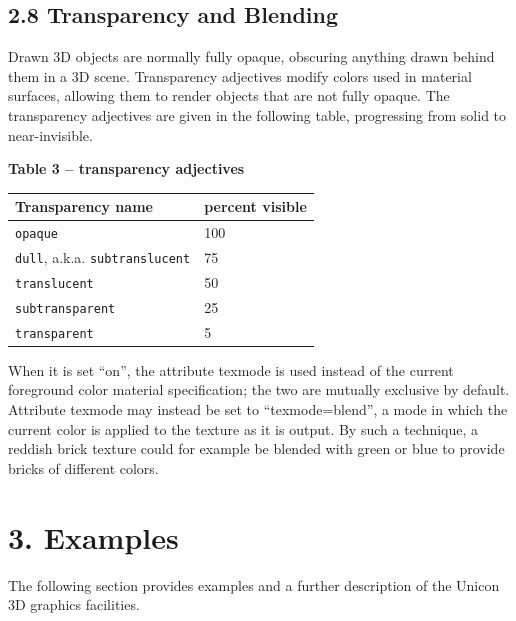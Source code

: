 \documentclass[letterpaper]{article}
\begin{document}
\subsection[2.8 Transparency and Blending]{2.8 Transparency and Blending}

Drawn 3D objects are normally fully opaque, obscuring anything drawn
behind them in a 3D scene. Transparency adjectives modify colors used
in material surfaces, allowing them to render objects that are not fully
opaque. The transparency adjectives are given in the following table,
progressing from solid to near-invisible.

\bigskip

{\centering{}\bfseries
Table 3 -- transparency adjectives
\par}

\begin{center}
\begin{tabular}{|l | l|}\hline
Transparency name & percent visible \\\hline
\texttt{opaque} & 100 \\
\texttt{dull}, a.k.a. \texttt{subtranslucent} & 75 \\
\texttt{translucent} & 50 \\
\texttt{subtransparent} & 25 \\
\texttt{transparent} & 5 \\\hline
\end{tabular}

\end{center}

\bigskip



When it is set \textsf{``on''}, the attribute \textsf{texmode} is used instead
of the current foreground color material specification; the two are
mutually exclusive by default.  Attribute \textsf{texmode} may instead be set
to \textsf{``texmode=blend''}, a mode in which the current color is
applied to the texture as it is output. By such a technique, a reddish
brick texture could for example be blended with green or blue to provide
bricks of different colors.


\section[3. Examples]{3. Examples}

The following section provides examples and a further description of
the Unicon 3D graphics facilities.
\end{document}
